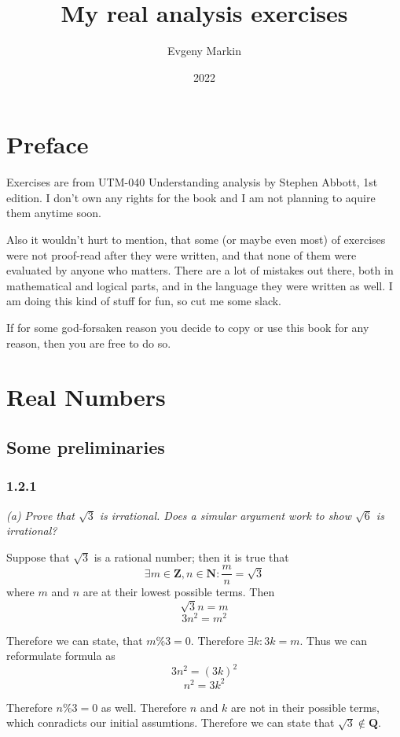 \documentclass[11pt,oneside,titlepage]{book}
\title{My real analysis exercises}
\author{Evgeny Markin}
\date{2022}
\begin{document}
\maketitle
\tableofcontents

\chapter*{Preface}

Exercises are from UTM-040 Understanding analysis by Stephen Abbott, 1st
edition. I don't own any rights
for the book and I am not planning to aquire them anytime soon. 

Also it wouldn't hurt to mention, that some (or maybe even most) of exercises
were not proof-read after they were written,  and that none of them were
evaluated by anyone who matters. There are a lot of mistakes out  there, both
in mathematical and logical parts, and in the language they were written as
well. I am doing this kind of stuff for fun, so cut me some slack.

If for some god-forsaken reason you decide to copy or use this book for
any reason, then you are free to do so.

\chapter{Real Numbers}

\section{Some preliminaries}
\subsection*{1.2.1}
\textit{(a) Prove that $\sqrt{3}$ is irrational. Does a simular argument work
  to show $\sqrt{6}$ is irrational?}

Suppose that $\sqrt{3}$ is a rational number; then it is true that
$$\exists m \in \textbf{Z}, n \in \textbf{N}: \frac{m}{n} = \sqrt{3}$$
where $m$ and $n$ are at their lowest possible terms. Then
$$\sqrt{3}n = m$$
$$3n^2 = m^2$$

Therefore we can state, that $m \% 3 = 0$. Therefore $\exists k: 3k = m$.
Thus we can reformulate formula as
$$3n^2 = (3k)^2$$
$$n^2 = 3k^2$$

Therefore $n\%3 = 0$ as well. Therefore $n$ and $k$ are not in their possible
terms, which conradicts our initial assumtions. Therefore we can state that
$\sqrt{3} \notin \textbf{Q}$.
\end{document}
